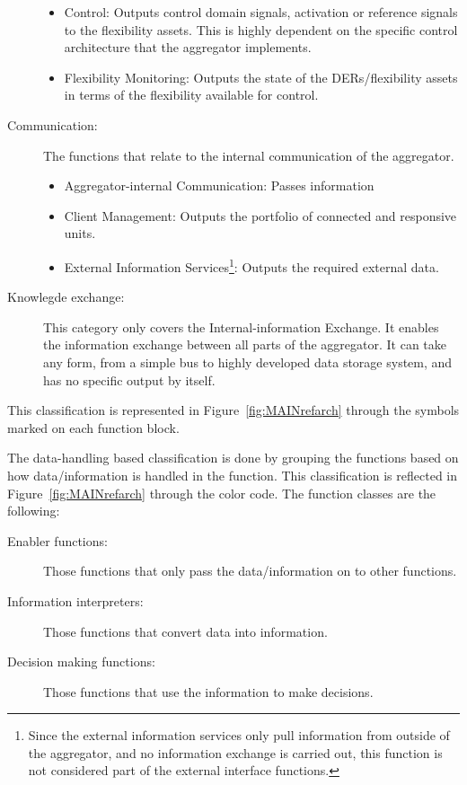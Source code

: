 \begin{description}
		\begin{itemize}
			\item Control: Outputs control domain signals, \eg activation or reference signals to the flexibility assets. This is highly dependent on the specific control architecture that the aggregator implements.
			\item Flexibility Monitoring: Outputs the state of the DERs/flexibility assets in terms of the flexibility available for control.
		\end{itemize}
	\item[Communication:] The functions that relate to the internal communication of the aggregator.
		\begin{itemize}
			\item Aggregator-internal Communication: Passes information
			\item Client Management: Outputs the portfolio of connected and responsive units.
			\item External Information Services\footnote{Since the external information services only pull information from outside of the aggregator, and no information exchange is carried out, this function is not considered part of the external interface functions.}: Outputs the required external data.
		\end{itemize}
	\item[Knowlegde exchange:] This category only covers the Internal-information Exchange. It enables the information exchange between all parts of the aggregator. It can take any form, from a simple bus to highly developed data storage system, and has no specific output by itself.
\end{description}
This classification is represented in Figure~\ref{fig:MAINrefarch} through the symbols marked on each function block.

The data-handling based classification is done by grouping the functions based on how data/information is handled in the function. This classification is reflected in Figure~\ref{fig:MAINrefarch} through the color code. The function classes are the following:
\begin{description}
	\item[Enabler functions:] Those functions that only pass the data/information on to other functions.
	\item[Information interpreters:] Those functions that convert data into information.
	\item[Decision making functions:] Those functions that use the information to make decisions.
\end{description}

